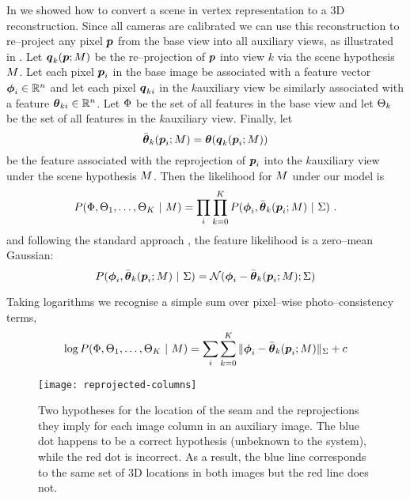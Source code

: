 In  we showed how to convert a scene in vertex
representation to a 3D reconstruction. Since all cameras are
calibrated we can use this reconstruction to re--project any pixel
$\Pixel$ from the base view into all auxiliary views, as illustrated in
. Let $\AuxPixel_k(\Pixel;\Scene)$ be the
re--projection of $\Pixel$ into view $k$ via the scene hypothesis
$\Scene$. Let each pixel $\Pixel_i$ in the base image be associated
with a feature vector $\Feature_i\in\Reals^n$ and let each pixel
$\AuxPixel_{ki}$ in the $k$\th auxiliary view be similarly associated
with a feature $\AuxFeature_{ki}\in\Reals^n$. Let $\Features$ be the
set of all features in the base view and let $\AuxFeatures_k$ be the
set of all features in the $k$\th auxiliary view. Finally, let
\begin{equation}
  \ComputedAuxFeature_k(\Pixel_i;\Scene) =
  \AuxFeature(\AuxPixel_k(\Pixel_i;\Scene))
\end{equation}
be the feature associated with the reprojection of $\Pixel_i$ into the
$k$\th auxiliary view under the scene hypothesis $\Scene$. Then the
likelihood for $\Scene$ under our model is
\begin{equation}
  P(\Features,\AuxFeatures_1,\ldots,\AuxFeatures_K ~|~ \Scene) =
    \prod_i \prod_{k=0}^{\NumViews} 
      P(\Feature_i, \ComputedAuxFeature_k(\Pixel_i;\Scene) ~|~
      \StereoCov)~.
  \label{eq:stereo-likelihood}
\end{equation}
and following the standard approach \cite{Scharstein01}, the feature
likelihood is a zero--mean Gaussian:
\begin{equation}
  P(\Feature_i, \ComputedAuxFeature_k(\Pixel_i;\Scene) ~|~ \StereoCov)
   = \NormalDistr(\Feature_i-\ComputedAuxFeature_k(\Pixel_i;\Scene); \StereoCov)
\end{equation}

Taking logarithms we recognise a simple sum over pixel--wise
photo--consistency terms,
\begin{equation}
  \label{eq:stereo-loglik}
  \log P(\Features,\AuxFeatures_1,\ldots,\AuxFeatures_{\NumViews}
            ~|~ \Scene) =
  \sum_i \sum_{k=0}^{\NumViews} 
    \|\Feature_i-\ComputedAuxFeature_k(\Pixel_i;\Scene)\|_{\StereoCov}
   +c
\end{equation}

\begin{figure}[tb]
  \centering \texttt{[image: reprojected-columns]}
  \caption{Two hypotheses for the location of the seam and the
    reprojections they imply for each image column in an auxiliary
    image. The blue dot happens to be a correct hypothesis (unbeknown
    to the system), while the red dot is incorrect. As a result, the
    blue line corresponds to the same set of 3D locations in both
    images but the red line does not.}
  \label{fig:reprojected-columns}
\end{figure}


